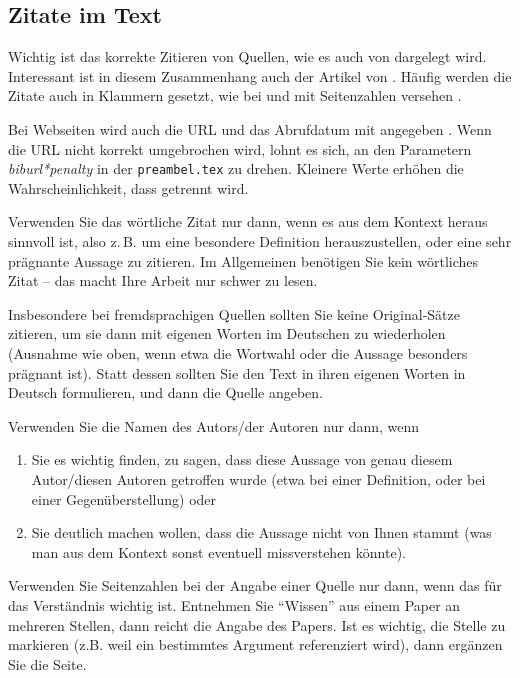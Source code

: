 \documentclass[conference,compsoc,final,a4paper]{IEEEtran}
\begin{document}
\subsection{Zitate im Text}
Wichtig ist das korrekte Zitieren von Quellen, wie es auch von \cite{Kornmeier2011} dargelegt wird. Interessant ist in diesem Zusammenhang auch der Artikel von \cite{Kramer2009}. Häufig werden die Zitate auch in Klammern gesetzt, wie bei \parencite{Kornmeier2011} und mit Seitenzahlen versehen \parencite[S. 22--24]{Kornmeier2011}.

Bei Webseiten wird auch die URL und das Abrufdatum mit angegeben \parencite{Gao2017}. Wenn die URL nicht korrekt umgebrochen wird, lohnt es sich, an den Parametern \textit{biburl*penalty} in der \texttt{preambel.tex} zu drehen. Kleinere Werte erhöhen die Wahrscheinlichkeit, dass getrennt wird.

Verwenden Sie das wörtliche Zitat nur dann, wenn es aus dem Kontext heraus sinnvoll ist, also z.\,B. um eine besondere Definition herauszustellen, oder eine sehr prägnante Aussage zu zitieren. Im Allgemeinen benötigen Sie kein wörtliches Zitat -- das macht Ihre Arbeit nur schwer zu lesen.

Insbesondere bei fremdsprachigen Quellen sollten Sie keine Original-Sätze zitieren, um sie dann mit eigenen Worten im Deutschen zu wiederholen (Ausnahme wie oben, wenn etwa die Wortwahl oder die Aussage besonders prägnant ist). Statt dessen sollten Sie den Text in ihren eigenen Worten in Deutsch formulieren, und dann die Quelle angeben.

Verwenden Sie die Namen des Autors/der Autoren nur dann, wenn 

\begin{enumerate}
\item Sie es wichtig finden, zu sagen, dass diese Aussage von genau diesem Autor/diesen Autoren getroffen wurde (etwa bei einer Definition, oder bei einer Gegenüberstellung) oder
\item Sie deutlich machen wollen, dass die Aussage nicht von Ihnen stammt (was man aus dem Kontext sonst eventuell missverstehen könnte).
\end{enumerate}

Verwenden Sie Seitenzahlen bei der Angabe einer Quelle nur dann, wenn das für das Verständnis wichtig ist. Entnehmen Sie \enquote{Wissen} aus einem Paper an mehreren Stellen, dann reicht die Angabe des Papers. Ist es wichtig, die Stelle zu markieren (z.B. weil ein bestimmtes Argument referenziert wird), dann ergänzen Sie die Seite.
\end{document}
